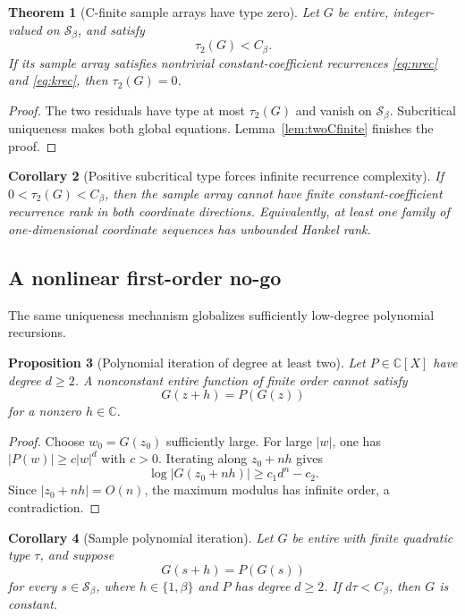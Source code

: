 \documentclass[11pt,oneside]{article}
\newtheorem{theorem}{Theorem}[section]
\newtheorem{proposition}[theorem]{Proposition}
\newtheorem{corollary}[theorem]{Corollary}
\theoremstyle{definition}
\theoremstyle{remark}
\newcommand{\C}{\mathbb C}
\newcommand{\Sbeta}{\mathcal S_\beta}
\newcommand{\Cbeta}{C_\beta}
\begin{document}
\begin{theorem}[C-finite sample arrays have type zero]
\label{thm:Cfinite}
Let $G$ be entire, integer-valued on $\Sbeta$, and satisfy
\[
 \tau_2(G)<\Cbeta.
\]
If its sample array satisfies nontrivial constant-coefficient recurrences
\eqref{eq:nrec} and \eqref{eq:krec}, then $\tau_2(G)=0$.
\end{theorem}

\begin{proof}
The two residuals have type at most $\tau_2(G)$ and vanish on $\Sbeta$.  Subcritical
uniqueness makes both global equations.  Lemma~\ref{lem:twoCfinite} finishes the proof.
\end{proof}

\begin{corollary}[Positive subcritical type forces infinite recurrence complexity]
\label{cor:infiniteHankel}
If $0<\tau_2(G)<\Cbeta$, then the sample array cannot have finite constant-coefficient
recurrence rank in both coordinate directions.  Equivalently, at least one family of
one-dimensional coordinate sequences has unbounded Hankel rank.
\end{corollary}

\subsection{A nonlinear first-order no-go}

The same uniqueness mechanism globalizes sufficiently low-degree polynomial recursions.

\begin{proposition}[Polynomial iteration of degree at least two]
\label{prop:polyiteration}
Let $P\in\C[X]$ have degree $d\ge2$.  A nonconstant entire function of finite order cannot
satisfy
\[
 G(z+h)=P(G(z))
\]
for a nonzero $h\in\C$.
\end{proposition}

\begin{proof}
Choose $w_0=G(z_0)$ sufficiently large.  For large $|w|$, one has
$|P(w)|\ge c|w|^d$ with $c>0$.  Iterating along $z_0+nh$ gives
\[
 \log|G(z_0+nh)|\ge c_1d^n-c_2.
\]
Since $|z_0+nh|=O(n)$, the maximum modulus has infinite order, a contradiction.
\end{proof}

\begin{corollary}[Sample polynomial iteration]
\label{cor:samplepolyiteration}
Let $G$ be entire with finite quadratic type $\tau$, and suppose
\[
 G(s+h)=P(G(s))
\]
for every $s\in\Sbeta$, where $h\in\{1,\beta\}$ and $P$ has degree $d\ge2$.  If
$d\tau<\Cbeta$, then $G$ is constant.
\end{corollary}
\end{document}
